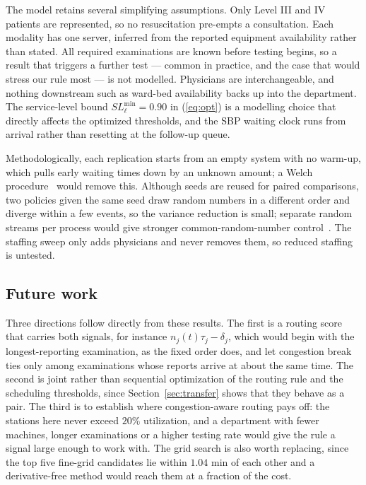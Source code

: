 \documentclass[sigconf]{acmart}
\begin{document}
The model retains several simplifying assumptions. Only Level III and IV
patients are represented, so no resuscitation pre-empts a consultation. Each
modality has one server, inferred from the reported equipment availability
rather than stated. All required examinations are known before testing begins,
so a result that triggers a further test --- common in practice, and the case
that would stress our rule most --- is not modelled. Physicians are
interchangeable, and nothing downstream such as ward-bed availability backs up
into the department. The service-level bound $SL^{\min}_\ell=0.90$ in
(\ref{eq:opt}) is a modelling choice that directly affects the optimized
thresholds, and the SBP waiting clock runs from arrival rather than resetting
at the follow-up queue.

Methodologically, each replication starts from an empty system with no warm-up,
which pulls early waiting times down by an unknown amount; a Welch
procedure~\cite{welch1983warmup} would remove this. Although seeds are reused
for paired comparisons, two policies given the same seed draw random numbers in
a different order and diverge within a few events, so the variance reduction is
small; separate random streams per process would give stronger
common-random-number control~\cite{law2015simulation}. The staffing sweep only
adds physicians and never removes them, so reduced staffing is untested.

\subsection{Future work}

Three directions follow directly from these results. The first is a routing
score that carries both signals, for instance $n_j(t)\tau_j-\delta_j$, which
would begin with the longest-reporting examination, as the fixed order does,
and let congestion break ties only among examinations whose reports arrive at
about the same time. The second is joint rather than sequential optimization of
the routing rule and the scheduling thresholds, since
Section~\ref{sec:transfer} shows that they behave as a pair. The third is to
establish where congestion-aware routing pays off: the stations here never
exceed $20\%$ utilization, and a department with fewer machines, longer
examinations or a higher testing rate would give the rule a signal large enough
to work with. The grid search is also worth replacing, since the top five
fine-grid candidates lie within $1.04$ min of each other and a derivative-free
method would reach them at a fraction of the cost.



\end{document}
